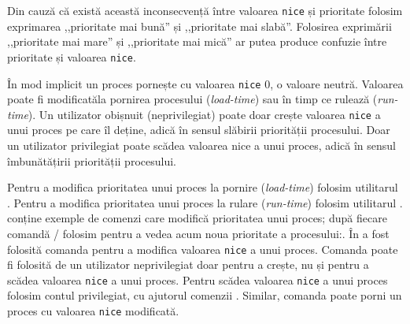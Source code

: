 \begin{note}
Din cauză că există această inconsecvență între valoarea \texttt{nice} și prioritate
folosim exprimarea ,,prioritate mai bună'' și ,,prioritate mai slabă''.
Folosirea exprimării ,,prioritate mai mare'' și ,,prioritate mai mică'' ar
putea produce confuzie între prioritate și valoarea \texttt{nice}.
\end{note}

În mod implicit un proces pornește cu valoarea \texttt{nice} 0, o valoare neutră.
Valoarea poate fi modificatăla pornirea procesului (\textit{load-time}) sau în timp ce
rulează (\textit{run-time}). Un utilizator obișnuit (neprivilegiat) poate doar crește
valoarea \texttt{nice} a unui proces pe care îl deține, adică în sensul slăbirii
priorității procesului. Doar un utilizator privilegiat poate scădea valoarea
nice a unui proces, adică în sensul îmbunătățirii priorității procesului.

Pentru a modifica prioritatea unui proces la pornire (\textit{load-time}) folosim
utilitarul . Pentru a modifica prioritatea unui proces la rulare (\textit{run-time})
folosim utilitarul .  conține exemple de comenzi care
modifică prioritatea unui proces; după fiecare comandă  /  folosim 
pentru a vedea acum noua prioritate a procesului:.
În  a fost folosită comanda  pentru a modifica valoarea \texttt{nice} a unui proces. Comanda poate fi folosită de un utilizator neprivilegiat doar pentru a crește, nu și pentru a scădea valoarea \texttt{nice} a unui proces. Pentru scădea valoarea \texttt{nice} a unui proces folosim contul privilegiat, cu ajutorul comenzii . Similar, comanda  poate porni un proces cu valoarea \texttt{nice} modificată.



